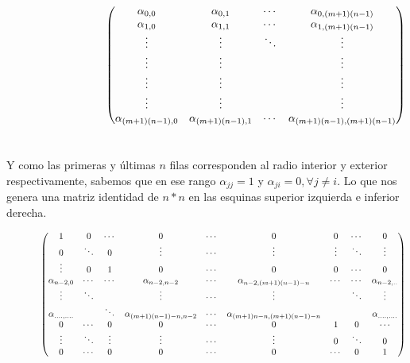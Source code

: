 $
\hspace{3.2cm}
     \begin{pmatrix}
      \alpha_{0,0} & \alpha_{0,1} & \cdots & \alpha_{0,(m+1)(n-1)} \\
      \alpha_{1,0} & \alpha_{1,1} & \cdots & \alpha_{1,(m+1)(n-1)} \\
      \vdots  & \vdots  & \ddots & \vdots \\
      \vdots  & \vdots  &        & \vdots \\
      \vdots  & \vdots  &        & \vdots \\
      \vdots  & \vdots  &        & \vdots \\
      \alpha_{(m+1)(n-1),0} & \alpha_{(m+1)(n-1),1} & \cdots & \alpha_{(m+1)(n-1),(m+1)(n-1)} 
     \end{pmatrix}
$
\\
\\
\\
Y como las primeras y \'ultimas $n$ filas corresponden al radio interior y exterior respectivamente, sabemos que en ese rango $\alpha_{jj} = 1$ y $\alpha_{ji} = 0, \forall j \neq i$. Lo que nos genera una matriz identidad de $n*n$ en las esquinas superior izquierda e inferior derecha.

$
\hspace{1.3cm}
     \begin{pmatrix}
      1 & 0 & \cdots & 0 & \cdots & 0 & 0 & \cdots & 0 \\
      0 & \ddots & 0 & \vdots & \cdots & \vdots & \vdots & \ddots & \vdots \\   
      \vdots  & 0  & 1 & 0 & \cdots & 0 & 0 & \cdots & 0 \\
      \alpha_{n-2,0} & \cdots & \cdots & \alpha_{n-2,n-2} & \cdots & \alpha_{n-2,(m+1)(n-1)-n} & \cdots & \cdots & \alpha_{n-2,..} \\
      \vdots  & \ddots  &  & \vdots & \cdots & \vdots &  & \ddots & \vdots \\        
      \alpha_{....,....} &  &\ddots & \alpha_{(m+1)(n-1)-n, n-2} & \cdots & \alpha_{(m+1)n-n,(m+1)(n-1)-n} & & & \alpha_{....,....}  \\
      0 & \cdots & 0 & 0 & \cdots & 0 & 1 & 0 & \cdots  \\
      \vdots & \ddots & \vdots & \vdots & \cdots & \vdots & 0 & \ddots & 0 \\
      0 & \cdots & 0 & 0 & \cdots  & 0 & \cdots & 0 & 1 
     \end{pmatrix}
$

